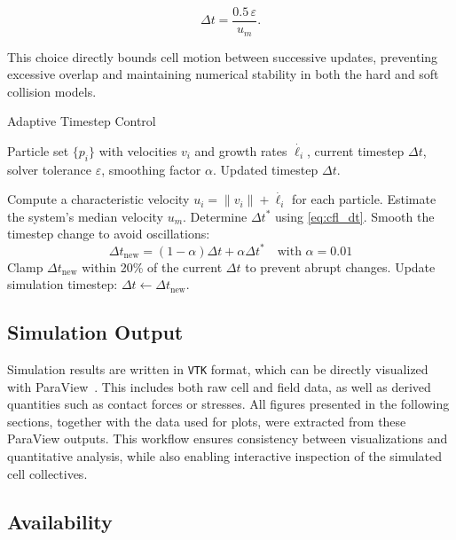 \documentclass[conference]{IEEEtran}
\begin{document}
\begin{equation} \label{eq:cfl_dt}
    \Delta t = \frac{0.5 \, \varepsilon}{u_m}.
\end{equation}

This choice directly bounds cell motion between successive updates, preventing excessive overlap and maintaining numerical stability in both the hard and soft collision models.





\begin{algorithm}[H]
    \caption{Adaptive Timestep Control}
    \label{alg:adaptive_dt}
    \begin{algorithmic}[1]
        \Require Particle set $\{p_i\}$ with velocities $v_i$ and growth rates $\dot{\ell_i}$,
        current timestep $\Delta t$, solver tolerance $\varepsilon$, smoothing factor $\alpha$.
        \Ensure Updated timestep $\Delta t$.

        \State Compute a characteristic velocity $u_i = \|v_i\| + \dot{\ell_i}$ for each particle.
        \State Estimate the system’s median velocity $u_m$.
        \State Determine $\Delta t^*$ using \autoref{eq:cfl_dt}.
        \State Smooth the timestep change to avoid oscillations:
        \[
            \Delta t_{\text{new}} = (1 - \alpha)\Delta t + \alpha \Delta t^* \quad \text{with } \alpha = 0.01
        \]
        \State Clamp $\Delta t_{\text{new}}$ within 20\% of the current $\Delta t$ to prevent abrupt changes.
        \State Update simulation timestep: $\Delta t \gets \Delta t_{\text{new}}$.
    \end{algorithmic}
\end{algorithm}


\subsection{Simulation Output}

Simulation results are written in \texttt{VTK} format, which can be directly visualized with ParaView~\cite{ahrens2005paraview}. This includes both raw cell and field data, as well as derived quantities such as contact forces or stresses.
All figures presented in the following sections, together with the data used for plots, were extracted from these ParaView outputs. This workflow ensures consistency between visualizations and quantitative analysis, while also enabling interactive inspection of the simulated cell collectives.


\subsection{Availability}
\end{document}
